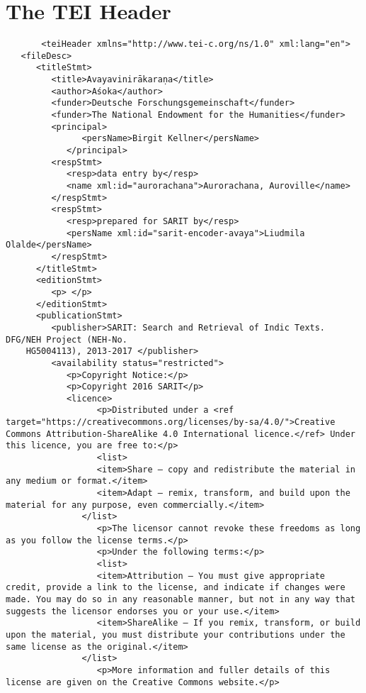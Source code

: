 \documentclass[article,12pt,a4paper]{memoir}%
\begin{document}
	 \chapter{The TEI Header}
	 \begin{verbatim}
       <teiHeader xmlns="http://www.tei-c.org/ns/1.0" xml:lang="en">
   <fileDesc>
      <titleStmt>
         <title>Avayavinirākaraṇa</title>
         <author>Aśoka</author>
         <funder>Deutsche Forschungsgemeinschaft</funder>
         <funder>The National Endowment for the Humanities</funder>
         <principal>
	           <persName>Birgit Kellner</persName>
	        </principal>
         <respStmt>
            <resp>data entry by</resp>
            <name xml:id="aurorachana">Aurorachana, Auroville</name>
         </respStmt>
         <respStmt>
            <resp>prepared for SARIT by</resp>
            <persName xml:id="sarit-encoder-avaya">Liudmila Olalde</persName>
         </respStmt>
      </titleStmt>
      <editionStmt>
         <p> </p>
      </editionStmt>
      <publicationStmt>
         <publisher>SARIT: Search and Retrieval of Indic Texts. DFG/NEH Project (NEH-No.
	HG5004113), 2013-2017 </publisher>
         <availability status="restricted">
            <p>Copyright Notice:</p>
            <p>Copyright 2016 SARIT</p>
            <licence> 
	              <p>Distributed under a <ref target="https://creativecommons.org/licenses/by-sa/4.0/">Creative Commons Attribution-ShareAlike 4.0 International licence.</ref> Under this licence, you are free to:</p>
	              <list>
                  <item>Share — copy and redistribute the material in any medium or format.</item>
                  <item>Adapt — remix, transform, and build upon the material for any purpose, even commercially.</item>
               </list>
	              <p>The licensor cannot revoke these freedoms as long as you follow the license terms.</p>
	              <p>Under the following terms:</p>
	              <list>
                  <item>Attribution — You must give appropriate credit, provide a link to the license, and indicate if changes were made. You may do so in any reasonable manner, but not in any way that suggests the licensor endorses you or your use.</item>
                  <item>ShareAlike — If you remix, transform, or build upon the material, you must distribute your contributions under the same license as the original.</item>
               </list>
	              <p>More information and fuller details of this license are given on the Creative Commons website.</p>

\end{verbatim}
\end{document}
